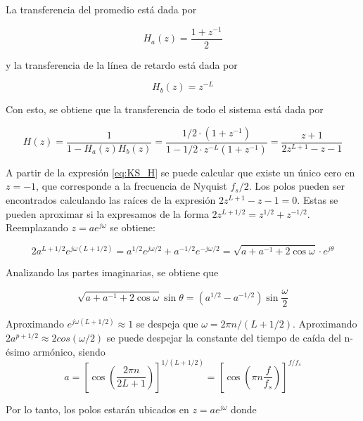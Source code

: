 La transferencia del promedio está dada por

\begin{equation}
    H_a(z) = \frac{1+z^{-1}}{2}
\end{equation}

y la transferencia de la línea de retardo está dada por

\begin{equation}
    H_b(z) = z^{-L}
\end{equation}

Con esto, se obtiene que la transferencia de todo el sistema está dada por

\begin{equation}
    H(z) = \frac{1}{1- H_a(z) H_b(z)} = \frac{1/2\cdot (1+z^{-1})}{1-1/2\cdot z^{-L}(1+z^{-1})}= \frac{z+1}{2z^{L+1}-z-1}
    \label{eq:KS_H}
\end{equation}

A partir de la expresión \eqref{eq:KS_H} se puede calcular que existe un único cero en $z=-1$, que corresponde a la frecuencia de Nyquist $f_s/2$. Los polos pueden ser encontrados calculando las raíces de la expresión $2z^{L+1}-z-1 = 0$. Estas se pueden aproximar si la expresamos de la forma $2z^{L+1/2} = z^{1/2} + z^{-1/2}$. Reemplazando $z=a e^{j\omega}$ se obtiene:

\begin{equation}
    2 a^{L+1/2} e^{j\omega(L+1/2)} = a^{1/2}e^{j\omega/2} + a^{-1/2}e^{-j\omega/2}=\sqrt{a + a^{-1} + 2 \cos\omega } \cdot e^{j\theta}
\end{equation}

Analizando las partes imaginarias, se obtiene que

\begin{equation*}
    \sqrt{a + a^{-1} + 2 \cos\omega } \sin\theta = (a^{1/2} - a^{-1/2}) \sin\frac{\omega}{2}
\end{equation*}

Aproximando $e^{j\omega(L+1/2)} \approx 1$ se despeja que $\omega = 2 \pi n / (L+1/2)$. Aproximando $2 a^{p+1/2}\approx 2 cos(\omega/2)$ se puede despejar la constante del tiempo de caída del n-ésimo armónico, siendo
\begin{equation}
    a=\left[\cos\left( \frac{2 \pi n}{2L+1}\right)\right]^{1/(L+1/2)} = \left[\cos\left( \pi n \frac{f}{f_s}\right) \right]^{f/f_s}
    \label{eq:ks_pole_mod}
\end{equation}

Por lo tanto, los polos estarán ubicados en $z = a e^{j\omega}$ donde

